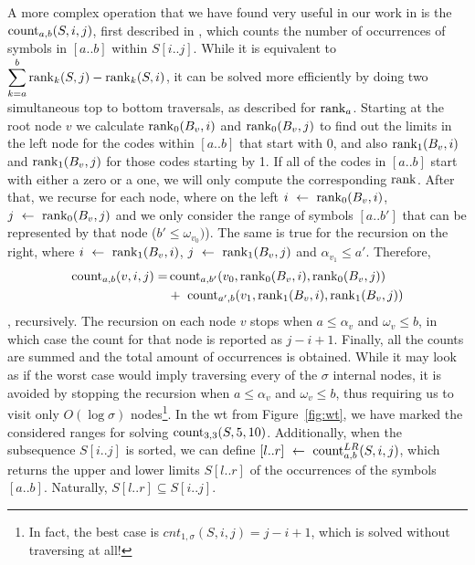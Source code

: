 \documentclass[a4paper,10pt,twoside]{book}
\begin{document}
    A more complex operation that we have found very useful in our work in is the $\operatorname{count}_{a,b}(S,i,j)$, first described in \cite{gagie2012new}, which counts the number of occurrences of symbols in $[a..b]$ within $S[i..j]$. While it is equivalent to $\displaystyle\sum^b_{k=a}\operatorname{rank}_k(S,j) - \operatorname{rank}_k(S,i)$, it can be solved more efficiently by doing two simultaneous top to bottom traversals, as described for $\operatorname{rank}_a$. Starting at the root node $v$ we calculate $\operatorname{rank}_0(B_v,i)$ and $\operatorname{rank}_0(B_v,j)$ to find out the limits in the left node for the codes within $[a..b]$ that start with 0, and also $\operatorname{rank}_1(B_v,i)$ and $\operatorname{rank}_1(B_v,j)$ for those codes starting by 1. If all of the codes in $[a..b]$ start with either a zero or a one, we will only compute the corresponding $\operatorname{rank}$. After that, we recurse for each node, where on the left $i~\leftarrow~\operatorname{rank}_0(B_v,i)$, $j~\leftarrow~\operatorname{rank}_0(B_v,j)$ and we only consider the range of symbols $[a..b']$ that can be represented by that node ($b' \leq \omega_{v_0})$). The same is true for the recursion on the right, where $i~\leftarrow~\operatorname{rank}_1(B_v,i)$, $j~\leftarrow~\operatorname{rank}_1(B_v,j)$ and $\alpha_{v_1} \leq a'$. Therefore, 
    \begin{align*}
    \operatorname{count}_{a,b}(v,i,j) = &\operatorname{count}_{a,b'}(v_0,\operatorname{rank}_0(B_v,i),\operatorname{rank}_0(B_v,j))\\
    &+~\operatorname{count}_{a',b}(v_1,\operatorname{rank}_1(B_v,i),\operatorname{rank}_1(B_v,j))
    \end{align*}
    , recursively. The recursion on each node $v$ stops when $a \leq \alpha_v$ and $\omega_v \leq b$, in which case the count for that node is reported as $j-i+1$. Finally, all the counts are summed and the total amount of occurrences is obtained. While it may look as if the worst case would imply traversing every of the $\sigma$ internal nodes, it is avoided by stopping the recursion when $a \leq \alpha_v$ and $\omega_v \leq b$, thus requiring us to visit only $O(\log\sigma)$ nodes\footnote{In fact, the best case is $cnt_{1,\sigma}(S,i,j) = j-i+1$, which is solved without traversing at all!}. In the \gls{wt} from Figure~\ref{fig:wt}, we have marked the considered ranges for solving $\operatorname{count}_{3,3}(S,5,10)$. Additionally, when the subsequence $S[i..j]$ is sorted, we can define $[l..r]~\leftarrow~\operatorname{count}^{LR}_{a,b}(S,i,j)$, which returns the upper and lower limits $S[l..r]$ of the occurrences of the symbols $[a..b]$. Naturally, $S[l..r] \subseteq S[i..j]$.
    
\end{document}
